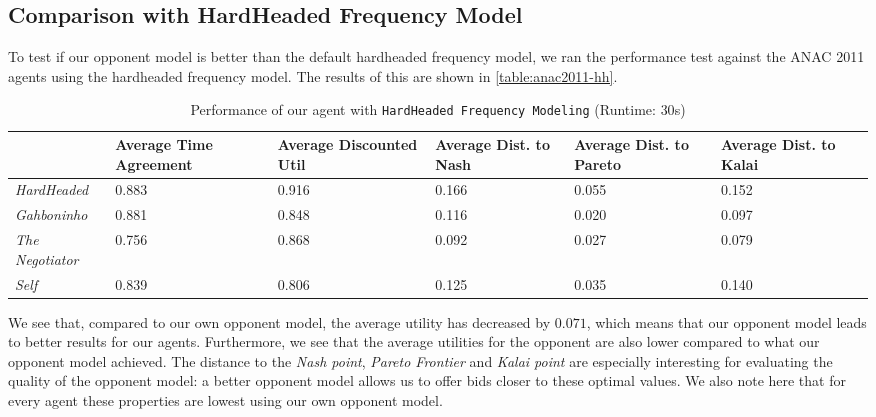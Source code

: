 \subsection{Comparison with HardHeaded Frequency Model}
To test if our opponent model is better than the default hardheaded frequency model, we ran the performance test against the ANAC 2011 agents using the hardheaded frequency model. The results of this are shown in \autoref{table:anac2011-hh}.
\begin{table}[H]
	\centering
	\small
    \begin{tabular}{l|p{2cm}|p{2cm}|p{2cm}|p{2cm}|p{2cm}|p{2cm}|}
    ~              & Average Time Agreement & Average Discounted Util & Average Dist. to Nash & Average Dist. to Pareto & Average Dist. to Kalai \\
    \hline
    \emph{HardHeaded}		& 0.883  & 0.916  & 0.166  & 0.055  & 0.152   \\ \hline
    \emph{Gahboninho}   	& 0.881  & 0.848  & 0.116  & 0.020  & 0.097   \\ \hline
    \emph{The Negotiator} 	& 0.756  & 0.868  & 0.092  & 0.027  & 0.079   \\ \hline
    \emph{Self}             & 0.839  & 0.806  & 0.125  & 0.035  & 0.140   \\ \hline
    \end{tabular}
    \caption{Performance of our agent with \texttt{HardHeaded Frequency Modeling} (Runtime: $30$s) \label{table:anac2011-hh}}
\end{table}
We see that, compared to our own opponent model, the average utility has decreased by $0.071$, which means that our opponent model leads to  better results for our agents. 
Furthermore, we see that the average utilities for the opponent are also lower compared to what our opponent model achieved.
The distance to the \emph{Nash point}, \emph{Pareto Frontier} and \emph{Kalai point} are especially interesting for evaluating the quality of the opponent model: a better opponent model allows us to offer bids closer to these optimal values. We also note here that for every agent these properties are lowest using our own opponent model.

